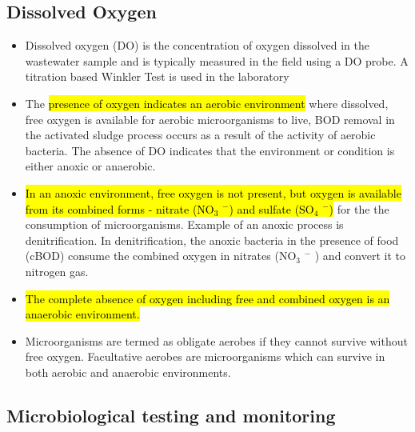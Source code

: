\subsection{Dissolved Oxygen}	
			\begin{itemize}
				\item Dissolved oxygen (DO) is the concentration of oxygen dissolved in the wastewater sample and is typically measured in the field using a DO probe.  A titration based Winkler Test is used in the laboratory
				\item The \hl{presence of oxygen indicates an aerobic environment} where dissolved, free oxygen is available for aerobic microorganisms to live, BOD removal in the activated sludge process occurs as a result of the activity of aerobic bacteria.  The absence of DO indicates that the environment or condition is either anoxic or anaerobic.  
				\item \hl{In an anoxic environment, free oxygen is not present, but oxygen is available from its combined  forms - nitrate (NO$_3$ $^-$) and sulfate (SO$_4$ $^-$)} for the the consumption of microorganisms.  Example of an anoxic process is denitrification.  In denitrification, the anoxic bacteria in the presence of food (cBOD) consume the combined oxygen in nitrates (NO$_3$ $^-$ ) and convert it to nitrogen gas.
				\item \hl{The complete absence of oxygen including free and combined oxygen is an anaerobic environment.}
				\item Microorganisms are termed as obligate aerobes if they cannot survive without free oxygen.  Facultative aerobes are microorganisms which can survive in both aerobic and anaerobic environments.  
			\end{itemize}
			
\subsection{Microbiological testing and monitoring}	
			
